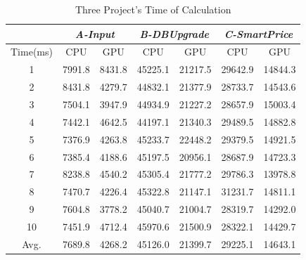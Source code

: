 \begin{table}
  \centering
  \caption{Three Project's Time of Calculation}
  \label{tab:consuming}
  \begin{tabular}{ccc|cc|cc}
    \hline
    & \multicolumn{2}{c}{ \emph{A-Input} } & \multicolumn{2}{c}{ \emph{B-DBUpgrade} } & \multicolumn{2}{c}{ \emph{C-SmartPrice} } \\
    \hline
      Time(ms) & \hspace{.25cm} CPU \hspace{.25cm} & \hspace{.25cm} GPU \hspace{.25cm} & \hspace{.25cm} CPU \hspace{.25cm} & \hspace{.25cm} GPU \hspace{.25cm} & \hspace{.25cm} CPU \hspace{.25cm} & \hspace{.25cm} GPU \hspace{.25cm}\\
    \hline
     1 & 7991.8 & 8431.8 & 45225.1 & 21217.5 & 29642.9 & 14844.3 \\
     2 & 8431.8 & 4279.7 & 44832.1 & 21377.9 & 28733.7 & 14543.6 \\
     3 & 7504.1 & 3947.9 & 44934.9 & 21227.2 & 28657.9 & 15003.4 \\
     4 & 7442.1 & 4642.5 & 44197.1 & 21340.3 & 29489.5 & 14882.8 \\
     5 & 7376.9 & 4263.8 & 45233.7 & 22448.2 & 29379.5 & 14921.5 \\
     6 & 7385.4 & 4188.6 & 45197.5 & 20956.1 & 28687.9 & 14723.3 \\
     7 & 8238.8 & 4540.2 & 45305.4 & 21777.2 & 29786.3 & 13978.8 \\
     8 & 7470.7 & 4226.4 & 45322.8 & 21147.1 & 31231.7 & 14811.1 \\
     9 & 7604.8 & 3778.2 & 45040.7 & 21004.7 & 28319.7 & 14292.0 \\
     10  & 7451.9 & 4712.4 & 45970.6 & 21500.9 & 28322.1 & 14429.7 \\
     Avg. & 7689.8 & 4268.2 & 45126.0 & 21399.7 & 29225.1 & 14643.1 \\
    \hline
  \end{tabular}
\end{table}


